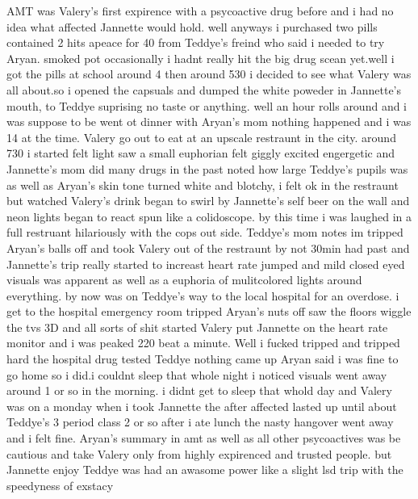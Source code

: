 \documentclass[12pt]{book}
\begin{document}
AMT was Valery's first expirence with a psycoactive drug before and i had no idea what affected Jannette would hold. well anyways i purchased two pills contained 2 hits apeace for 40 from Teddye's freind who said i needed to try Aryan. smoked pot occasionally i hadnt really hit the big drug scean yet.well i got the pills at school around 4 then around 530 i decided to see what Valery was all about.so i opened the capsuals and dumped the white poweder in Jannette's mouth, to Teddye suprising no taste or anything. well an hour rolls around and i was suppose to be went ot dinner with Aryan's mom nothing happened and i was 14 at the time. Valery go out to eat at an upscale restraunt in the city. around 730 i started felt light saw a small euphorian felt giggly excited engergetic and Jannette's mom did many drugs in the past noted how large Teddye's pupils was as well as Aryan's skin tone turned white and blotchy, i felt ok in the restraunt but watched Valery's drink began to swirl by Jannette's self beer on the wall and neon lights began to react spun like a colidoscope. by this time i was laughed in a full restruant hilariously with the cops out side. Teddye's mom notes im tripped Aryan's balls off and took Valery out of the restraunt by not 30min had past and Jannette's trip really started to increast heart rate jumped and mild closed eyed visuals was apparent as well as a euphoria of mulitcolored lights around everything. by now was on Teddye's way to the local hospital for an overdose. i get to the hospital emergency room tripped Aryan's nuts off saw the floors wiggle the tvs 3D and all sorts of shit started Valery put Jannette on the heart rate monitor and i was peaked 220 beat a minute. Well i fucked tripped and tripped hard the hospital drug tested Teddye nothing came up Aryan said i was fine to go home so i did.i couldnt sleep that whole night i noticed visuals went away around 1 or so in the morning. i didnt get to sleep that whold day and Valery was on a monday when i took Jannette the after affected lasted up until about Teddye's 3 period class 2 or so after i ate lunch the nasty hangover went away and i felt fine. Aryan's summary in amt as well as all other psycoactives was be cautious and take Valery only from highly expirenced and trusted people. but Jannette enjoy Teddye was had an awasome power like a slight lsd trip with the speedyness of exstacy
\end{document}
